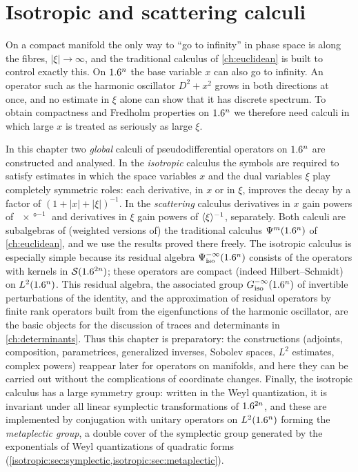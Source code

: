 \chapter{Isotropic and scattering calculi}\label{ch:isotropic}
\providecommand{\Gs}[1]{\Gamma^{#1}}
\providecommand{\Gph}[1]{\Gamma^{#1}_{\mathrm{ph}}}
\providecommand{\Psiisoph}[1]{\Psi^{#1}_{\mathrm{iso,ph}}}
\providecommand{\Hiso}[1]{H^{#1}_{\mathrm{iso}}}
\providecommand{\Gres}{G^{-\infty}_{\mathrm{iso}}}
\providecommand{\Ampl}[1]{\mathcal{A}^{#1}}
\providecommand{\rc}{\operatorname{RC}}
\providecommand{\Hsph}[1]{\mathbb{S}^{#1}_{+}}
\providecommand{\Psiscph}[1]{\Psi^{#1}_{\mathrm{sc,ph}}}
\providecommand{\OpW}{\operatorname{Op}^{\mathrm{W}}}

On a compact manifold the only way to ``go to infinity'' in phase space is
along the fibres, $|\xi|\to\infty$, and the traditional calculus of
\cref{ch:euclidean} is built to control exactly this. On $1.6^n$ the base
variable $x$ can also go to infinity. An operator such as the harmonic
oscillator $D^2+x^2$ grows in both directions at once, and no estimate in
$\xi$ alone can show that it has discrete spectrum. To obtain compactness and
Fredholm properties on $1.6^n$ we therefore need calculi in which large $x$ is
treated as seriously as large $\xi$.

In this chapter two \emph{global} calculi of pseudodifferential operators on
$1.6^n$ are constructed and analysed. In the \emph{isotropic} calculus the
symbols are required to satisfy estimates in which the space variables $x$ and
the dual variables $\xi$ play completely symmetric roles: each derivative, in
$x$ or in $\xi$, improves the decay by a factor of $(1+|x|+|\xi|)^{-1}$. In
the \emph{scattering} calculus derivatives in $x$ gain powers of
$\ang{x}^{-1}$ and derivatives in $\xi$ gain powers of $\langle \xi\rangle^{-1}$,
separately. Both calculi are subalgebras of (weighted versions of) the
traditional calculus $\Psi^{m}(1.6^n)$ of \cref{ch:euclidean}, and we use the
results proved there freely. The isotropic calculus is especially simple
because its residual algebra $\Psi^{-\infty}_{\mathrm{iso}}(1.6^n)$ consists of the
operators with kernels in $\mathcal{S}(1.6^{2n})$; these operators are compact (indeed
Hilbert--Schmidt) on $L^2(1.6^n)$. This residual algebra, the associated group
$\Gres(\R^n)$ of invertible perturbations of the identity, and the
approximation of residual operators by finite rank operators built from the
eigenfunctions of the harmonic oscillator, are the basic objects for the
discussion of traces and determinants in \cref{ch:determinants}. Thus this
chapter is preparatory: the constructions (adjoints, composition,
parametrices, generalized inverses, Sobolev spaces, $L^2$ estimates, complex
powers) reappear later for operators on manifolds, and here they can be
carried out without the complications of coordinate changes. Finally, the
isotropic calculus has a large symmetry group: written in the Weyl
quantization, it is invariant under all linear symplectic transformations of
$1.6^{2n}$, and these are implemented by conjugation with unitary operators on
$L^2(1.6^n)$ forming the \emph{metaplectic group}, a double cover of the
symplectic group generated by the exponentials of Weyl quantizations of
quadratic forms (\cref{isotropic:sec:symplectic,isotropic:sec:metaplectic}).

